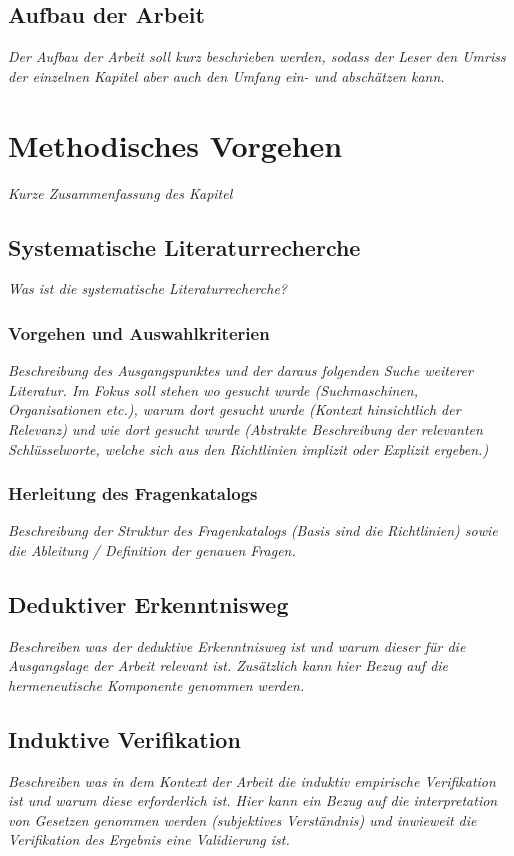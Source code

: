 \documentclass[11pt,a4paper,hidelinks]{article}   %
\begin{document}
    \subsection{Aufbau der Arbeit}
        \emph{Der Aufbau der Arbeit soll kurz beschrieben werden, sodass der Leser den Umriss der einzelnen Kapitel aber auch den Umfang ein- und abschätzen kann.}


    \newpage
    \section{Methodisches Vorgehen}
        \emph{Kurze Zusammenfassung des Kapitel}
        \subsection{Systematische Literaturrecherche}
            \emph{Was ist die systematische Literaturrecherche?}
            \subsubsection{Vorgehen und Auswahlkriterien}
                \emph{Beschreibung des Ausgangspunktes und der daraus folgenden Suche weiterer Literatur. Im Fokus soll stehen wo gesucht wurde (Suchmaschinen, Organisationen etc.), warum dort gesucht wurde (Kontext hinsichtlich der Relevanz) und wie dort gesucht wurde (Abstrakte Beschreibung der relevanten Schlüsselworte, welche sich aus den Richtlinien implizit oder Explizit ergeben.)}
            \subsubsection{Herleitung des Fragenkatalogs}
                \emph{Beschreibung der Struktur des Fragenkatalogs (Basis sind die Richtlinien) sowie die Ableitung / Definition der genauen Fragen.}
        \subsection{Deduktiver Erkenntnisweg}
            \emph{Beschreiben was der deduktive Erkenntnisweg ist und warum dieser für die Ausgangslage der Arbeit relevant ist. Zusätzlich kann hier Bezug auf die hermeneutische Komponente genommen werden.}
        \subsection{Induktive Verifikation}
            \emph{Beschreiben was in dem Kontext der Arbeit die induktiv empirische Verifikation ist und warum diese erforderlich ist. Hier kann ein Bezug auf die interpretation von Gesetzen genommen werden (subjektives Verständnis) und inwieweit die Verifikation des Ergebnis eine Validierung ist.}
\end{document}
